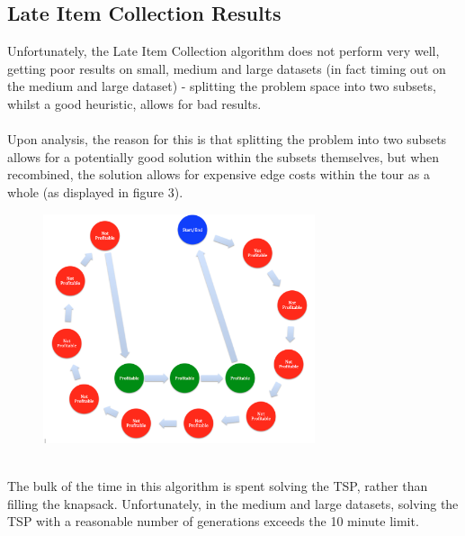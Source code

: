 \documentclass[a4paper,12pt]{article}
\begin{document}
\subsection*{Late Item Collection Results}
Unfortunately, the Late Item Collection algorithm does not perform very well, getting poor results on small, medium and large datasets (in fact timing out on the medium and large dataset) - splitting the problem space into two subsets, whilst a good heuristic, allows for bad results.\\
\\
Upon analysis, the reason for this is that splitting the problem into two subsets allows for a potentially good solution within the subsets themselves, but when recombined, the solution allows for expensive edge costs within the tour as a whole (as displayed in figure 3).
\begin{figure}[h]
\centering
\includegraphics[width=80mm]{TheIssue.png}
\end{figure}
\\
The bulk of the time in this algorithm is spent solving the TSP, rather than filling the knapsack. Unfortunately, in the medium and large datasets, solving the TSP with a reasonable number of generations exceeds the 10 minute limit.\\
\end{document}
